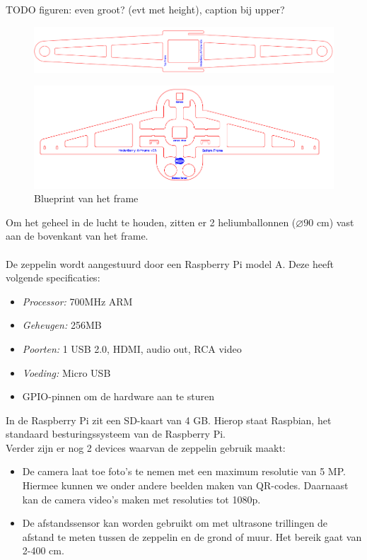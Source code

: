 \documentclass[eind]{penoverslag}
\begin{document}
TODO figuren: even groot? (evt met height), caption bij upper?

\begin{figure}[ht!]
\centering
\includegraphics[scale=0.3]{upperFrame.png}
\label{frame}
\end{figure}

\begin{figure}[ht!]
\centering
\includegraphics[scale=0.3]{lowerFrame.png}
\caption{Blueprint van het frame}
\label{frame}
\end{figure}

Om het geheel in de lucht te houden, zitten er 2 heliumballonnen ($\diameter$90 cm) vast aan de bovenkant van het frame. \\
\\
De zeppelin wordt aangestuurd door een Raspberry Pi model A. Deze heeft volgende specificaties: 
\begin{itemize}
	\item \emph{Processor:} 700MHz ARM
	\item \emph{Geheugen:} 256MB 
	\item \emph{Poorten:} 1 USB 2.0, HDMI, audio out, RCA video
	\item \emph{Voeding:} Micro USB
	\item GPIO-pinnen om de hardware aan te sturen
\end{itemize}

In de Raspberry Pi zit een SD-kaart van 4 GB. Hierop staat Raspbian, het standaard besturingssysteem van de Raspberry Pi. \\

Verder zijn er nog 2 devices waarvan de zeppelin gebruik maakt:
\begin{itemize}
	\item De camera laat toe foto's te nemen met een maximum resolutie van 5 MP. Hiermee kunnen we onder andere beelden maken van QR-codes. Daarnaast kan de camera video's maken met resoluties tot 1080p. 
	\item De afstandssensor kan worden gebruikt om met ultrasone trillingen de afstand te meten tussen de zeppelin en de grond of muur. Het bereik gaat van 2-400 cm. \\
\end{itemize}
\end{document}
